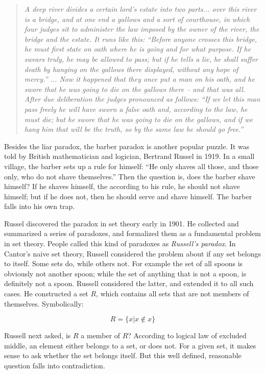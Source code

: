 \documentclass{article}
\begin{document}
\begin{quotation}
\itshape
A deep river divides a certain lord’s estate into two parts... over this river is a bridge, and at one end a gallows and a sort of courthouse, in which four judges sit to administer the law imposed by the owner of the river, the bridge and the estate. It runs like this: ``Before anyone crosses this bridge, he must first state on oath where he is going and for what purpose. If he swears truly, he may be allowed to pass; but if he tells a lie, he shall suffer death by hanging on the gallows there displayed, without any hope of mercy.'' ... Now it happened that they once put a man on his oath, and he swore that he was going to die on the gallows there -- and that was all. After due deliberation the judges pronounced as follows: ``If we let this man pass freely he will have sworn a false oath and, according to the law, he must die; but he swore that he was going to die on the gallows, and if we hang him that will be the truth, so by the same law he should go free.''
\end{quotation}

Besides the liar paradox, the barber paradox is another popular puzzle. It was told by British mathematician and logician, Bertrand Russel in 1919. In a small village, the barber sets up a rule for himself: ``He only shaves all those, and those only, who do not shave themselves.'' Then the question is, does the barber shave himself? If he shaves himself, the according to his rule, he should not shave himself; but if he does not, then he should serve and shave himself. The barber falls into his own trap.

Russel discovered the paradox in set theory early in 1901. He collected and summarized a series of paradoxes, and formalized them as a fundamental problem in set theory. People called this kind of paradoxes as {\em Russell's paradox}. In Cantor's naive set theory, Russell considered the problem about if any set belongs to itself. Some sets do, while others not. For example the set of all spoons is obviously not another spoon; while the set of anything that is not a spoon, is definitely not a spoon. Russell considered the latter, and extended it to all such cases. He constructed a set $R$, which contains all sets that are not members of themselves. Symbolically:

\[
R = \{ x | x \notin x \}
\]

Russell next asked, is $R$ a member of $R$? According to logical law of excluded middle, an element either belongs to a set, or does not. For a given set, it makes sense to ask whether the set belongs itself. But this well defined, reasonable question falls into contradiction.
\end{document}
